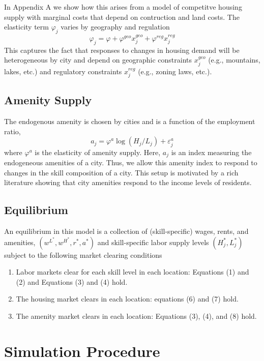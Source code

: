 \documentclass{article}
\begin{document}
In Appendix A we show how this arises from a model of competitve housing supply with marginal costs that depend on contruction and land costs. The elasticity term $\varphi_j$ varies by geography and regulation
$$\varphi_j = \varphi + \varphi^{geo}x_j^{geo} + \varphi^{reg} x_j^{reg}$$
This captures the fact that responses to changes in housing demand will be heterogeneous by city and depend on geographic constraints $x_j^{geo}$ (e.g., mountains, lakes, etc.) and regulatory constraints $x_j^{reg}$ (e.g., zoning laws, etc.). 

\subsection{Amenity Supply}
The endogenous amenity is chosen by cities and is a function of the employment ratio,
\begin{equation}\label{eq: amenity supply} 
a_{j} = \varphi^a \log(H_{j}/L_{j}) + \varepsilon^a_{j} \end{equation}
where $\varphi^a$ is the elasticity of amenity supply. Here, $a_{j}$ is an index measuring the endogeneous amenities of a city. Thus, we allow this amenity index to respond to changes in the skill composition of a city. This setup is motivated by a rich literature showing that city amenities respond to the income levels of residents. 



\subsection{Equilibrium}
An equilibrium in this model is a collection of (skill-specific) wages, rents, and amenities, $(w^{L^*},w^{H^*},r^*,a^*)$ and skill-specific labor supply levels $(H_{j}^*,L_{j}^*)$ subject to the following market clearing conditions 
\begin{enumerate}
\item Labor markets clear for each skill level in each location: Equations (1) and (2) and Equations (3) and (4) hold. 
\item The housing market clears in each location: equations (6) and (7) hold.

\item The amenity market clears in each location: 
Equations (3), (4), and (8) hold. 
\end{enumerate}

\section{Simulation Procedure}
\end{document}
